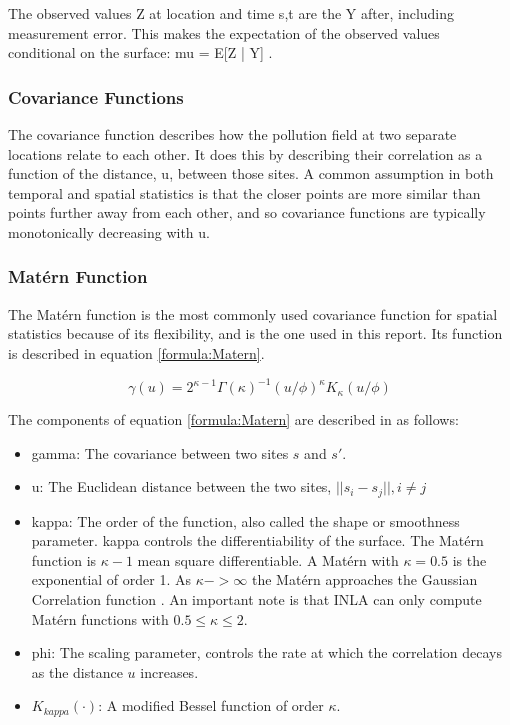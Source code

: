 \documentclass{article}
\begin{document}
The observed values 
 \gls{Z} at location and time \gls{s,t} are the \gls{Y} after, including measurement error.  This makes the expectation of the observed values conditional on the surface:
\gls{mu} = 
E[\gls{Z} | \gls{Y}] 
\citep{diggle:07}.

\subsubsection*{Covariance Functions}
\label{subsubsec:covariances}
The covariance function describes how the pollution field at two separate locations relate to each other. It does this by describing their correlation as a function of the distance, \gls{u}, between those sites.  A common assumption in both temporal and spatial statistics is that the closer points are more similar than points further away from each other, and so covariance functions are typically monotonically decreasing with \gls{u}.

\subsubsection*{Mat\'{e}rn Function} \label{subsubsec:MaternIntro}
The Mat\'{e}rn function is the most commonly used covariance function for spatial statistics because of its flexibility, \citep{diggle:07} and is the one used in this report.  Its function is described in equation \ref{formula:Matern}.

\begin{equation}  \label{formula:Matern}
    \gamma(u) = {2^{\kappa -1}\Gamma(\kappa)^{-1}(u/\phi)^{\kappa}K_{\kappa}(u/\phi)}
\end{equation}

The components of equation \ref{formula:Matern} are described in \cite{diggle:07} as follows:
\begin{itemize}
    \item \gls{gamma}:  The covariance between two sites $s$ and $s'$.
    \item \gls{u}: The Euclidean distance between the two sites,  $||s_i - s_j||, i \neq j$
    \item \gls{kappa}: The order of the function, also called the shape or smoothness parameter.  \gls{kappa} controls the differentiability of the surface.  The Mat\'{e}rn function is $\kappa -1$ mean square differentiable.  A Mat\'{e}rn with $\kappa = 0.5$ is the exponential of order 1.  As $\kappa -> \infty$  the Mat\'{e}rn approaches the Gaussian Correlation function  \cite{diggle:07}.  An important note is that INLA can only compute Mat\'{e}rn functions with $0.5 \leq \kappa \leq 2$.
    \item \gls{phi}: The scaling parameter, controls the rate at which the correlation decays as the distance $u$ increases.
    \item $K_{kappa}(\cdot)$: A modified Bessel function of order $\kappa$.
\end{itemize} 
\end{document}
